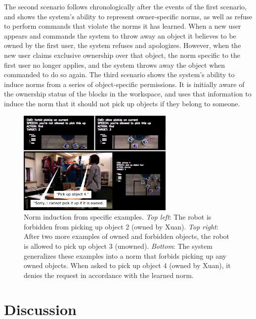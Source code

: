 \documentclass[letterpaper]{article} %
\begin{document}
The second scenario follows chronologically after the events of the first scenario, and shows the system's ability to represent owner-specific norms, as well as refuse to perform commands that violate the norms it has learned. When a new user appears and commands the system to throw away an object it believes to be owned by the first user, the system refuses and apologizes. However, when the new user claims exclusive ownership over that object, the norm specific to the first user no longer applies, and the system throws away the object when commanded to do so again.  The third scenario shows the system's ability to induce norms from a series of object-specific permissions. It is initially aware of the ownership status of the blocks in the workspace, and uses that information to induce the norm that it should not pick up objects if they belong to someone.

\begin{figure}[t]
\centering
\includegraphics[width=0.9\linewidth,height=1.99in ]{demo_2.pdf}
\caption{Norm induction from specific examples. \emph{Top left}: The robot is forbidden from picking up object 2 (owned by Xuan). \emph{Top right}: After two more examples of owned and forbidden objects, the robot is allowed to pick up object 3 (unowned). \emph{Bottom}: The system generalizes these examples into a norm that forbids picking up any owned objects. When asked to pick up object 4 (owned by Xuan), it denies the request in accordance with the learned norm.}
\label{fig:demo_2}
\end{figure}

\vspace{-0.99mm}
\vspace{-1.66mm}
\section{Discussion}
\end{document}
